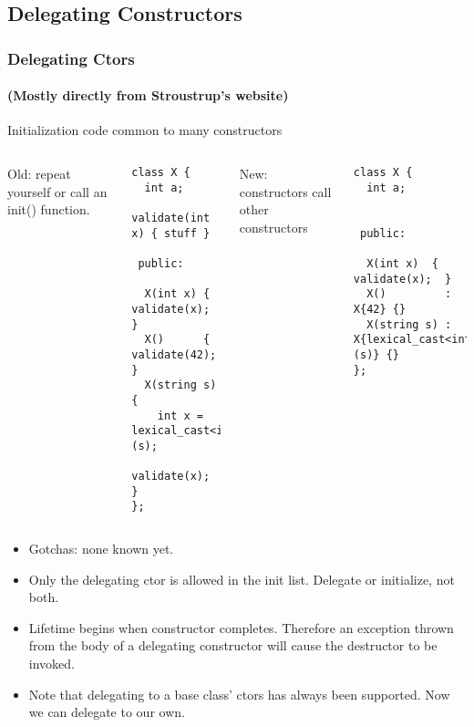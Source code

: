 
\subsection{Delegating Constructors}
\lyxframeend{}


\begin{frame}[fragile]
\frametitle{Delegating Ctors}
\framesubtitle{(Mostly directly from Stroustrup's website)}
Initialization code common to many constructors
\begin{columns}[t]
{\scriptsize
Old: repeat yourself or call an init() function.
\begin{verbatim}
class X {
  int a;
  validate(int x) { stuff }

 public:

  X(int x) { validate(x); }
  X()      { validate(42); }
  X(string s) { 
    int x = lexical_cast<int>(s);
    validate(x);      }
};
\end{verbatim}
}
\pause{}
{\scriptsize
New: constructors call other constructors

\begin{verbatim}
class X {
  int a;


 public:

  X(int x)  { validate(x);  }
  X()         : X{42} {}
  X(string s) : X{lexical_cast<int>(s)} {}
};
\end{verbatim}
}
\end{columns}

\pause{}

\begin{itemize}
\item Gotchas: none known yet.
\item Only the delegating ctor is allowed in the init list.  Delegate
  or initialize, not both.
\item Lifetime begins when  constructor completes.
  Therefore an exception thrown from the body of a
  delegating constructor will cause the destructor to be invoked.

\item Note that delegating to a base class' ctors has always been
supported.  Now we can delegate to our own.

\end{itemize}
\end{frame}

